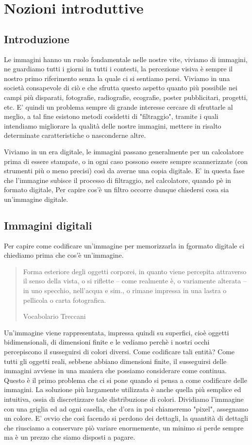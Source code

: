 \chapter{Nozioni introduttive}

\section{Introduzione}
Le immagini hanno un ruolo fondamentale nelle nostre vite, viviamo di immagini, ne guardiamo tutti i giorni in tutti i contesti, la percezione visiva è sempre il nostro primo riferimento senza la quale ci si sentiamo persi.
Viviamo in una società consapevole di ciò e che sfrutta questo aspetto quanto più possibile nei campi più disparati, fotografie, radiografie, ecografie, poster pubblicitari, progetti, etc.
E' quindi un problema sempre di grande interesse cercare di sfruttarle al meglio, a tal fine esistono metodi cosìdetti di "filtraggio", tramite i quali intendiamo migliorare la qualità delle nostre immagini, mettere in risalto determinate caratteristiche o nasconderne altre.

Viviamo in un era digitale, le immagini passano generalmente per un calcolatore prima di essere stampate, o in ogni caso possono essere sempre scannerizzate (con strumenti più o meno precisi) così da averne una copia digitale.
E' in questa fase che l'immagine subisce il processo di filtraggio, nel calcolatore, quando pè in formato digitale, Per capire cos'è un filtro occorre dunque chiedersi cosa sia un'immagine digitale.

\section{Immagini digitali}
Per capire come codificare un'immagine per memorizzarla in fgormato digitale ci chiediamo prima che cos'è un'immagine.

\begin{quote}
\epigraph{Forma esteriore degli oggetti corporei, in quanto viene percepita attraverso il senso della vista, o si riflette – come realmente è, o variamente alterata – in uno specchio, nell’acqua e sim., o rimane impressa in una lastra o pellicola o carta fotografica.}{Vocabolario Treccani}
\end{quote}


Un'immagine viene rappresentata, impressa quindi su superfici, cioè oggetti bidimensionali, di dimensioni finite e le vediamo perchè i nostri occhi percepiscono il susseguirsi di colori diversi. Come codificare tali entità?
Come tutti gli oggetti reali, sebbene abbiano dimensioni finite, il susseguirsi delle immagini avviene in una maniera che possiamo considerare come continua. Questo è il primo problema che ci si pone quando si pensa a come codificare delle immagini.
La soluzione più largamente utilizzata è anche quella più semplice ed intuitiva, ossia di discretizzare tale distribuzione di colori. Dividiamo l'immagine con una griglia ed ad ogni casella, che d'ora in poi chiameremo "pixel", assegnamo un colore. 
E' ovvio che così facendo si perdono dei dettagli, la quantità di dettagli che riusciamo a conservare piò variare enormemente, un minimo si perde sempre ma è un  prezzo che siamo disposti a pagare.


